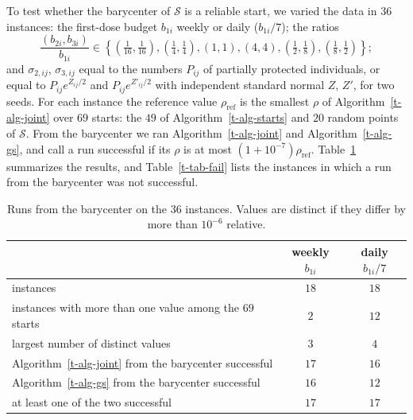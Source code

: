 \documentclass[11pt]{article}
\theoremstyle{plain}
\theoremstyle{remark}
\numberwithin{equation}{section}
\begin{document}
To test whether the barycenter of $\mathcal{S}$ is a reliable start, we varied
the data in $36$ instances: the first-dose budget $b_{1i}$ weekly or daily
($b_{1i}/7$); the ratios
\begin{equation}
\frac{(b_{2i},b_{3i})}{b_{1i}}\in\left\{\left(\tfrac1{16},\tfrac1{16}\right),\left(\tfrac14,\tfrac14\right),(1,1),(4,4),\left(\tfrac12,\tfrac18\right),\left(\tfrac18,\tfrac12\right)\right\};
\end{equation}
and $\sigma_{2,ij}$, $\sigma_{3,ij}$ equal to the numbers $P_{ij}$ of partially
protected individuals, or equal to $P_{ij}e^{Z_{ij}/2}$ and $P_{ij}e^{Z'_{ij}/2}$
with independent standard normal $Z$, $Z'$, for two seeds. For each instance
the reference value $\rho_{\mathrm{ref}}$ is the smallest $\rho$ of
Algorithm~\ref{t-alg-joint} over $69$ starts: the $49$ of
Algorithm~\ref{t-alg-starts} and $20$ random points of $\mathcal{S}$. From the
barycenter we ran Algorithm~\ref{t-alg-joint} and Algorithm~\ref{t-alg-gs}, and
call a run successful if its $\rho$ is at most $(1+10^{-7})\rho_{\mathrm{ref}}$.
Table~\ref{t-tab-inst} summarizes the results, and Table~\ref{t-tab-fail} lists
the instances in which a run from the barycenter was not successful.

\begin{table}[ht]
\centering
\small
\begin{tabular}{lcc}
\hline
 & weekly $b_{1i}$ & daily $b_{1i}/7$\\
\hline
instances & $18$ & $18$\\
instances with more than one value among the $69$ starts & $2$ & $12$\\
largest number of distinct values & $3$ & $4$\\
Algorithm~\ref{t-alg-joint} from the barycenter successful & $17$ & $16$\\
Algorithm~\ref{t-alg-gs} from the barycenter successful & $16$ & $12$\\
at least one of the two successful & $17$ & $17$\\
\hline
\end{tabular}
\caption{Runs from the barycenter on the $36$ instances. Values are distinct if
they differ by more than $10^{-6}$ relative.}\label{t-tab-inst}
\end{table}
\end{document}
